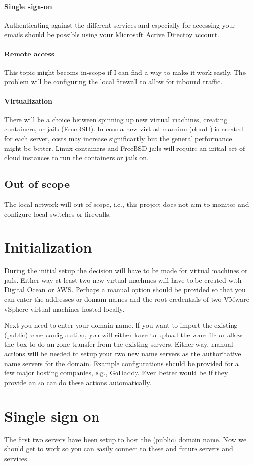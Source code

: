 \documentclass[a4paper,12pt]{scrartcl}
\begin{document}
\paragraph{Single sign-on}
Authenticating against the different services and especially for accessing your emails should be possible using your Microsoft Active Directoy account.

\paragraph{Remote access }
This topic might become in-scope if I can find a way to make it work easily.
The problem will be configuring the local firewall to allow for inbound traffic.

\paragraph{Virtualization}
There will be a choice between spinning up new virtual machines, creating containers, or jails (FreeBSD).
In case a new virtual machine (cloud ) is created for each server, costs may increase significantly but the general performance might be better.
Linux containers and FreeBSD jails will require an initial set of cloud  instances to run the containers or jails on.

\subsection{Out of scope}
The local network will out of scope, i.e., this project does not aim to monitor and configure local switches or firewalls.


\section{Initialization}
\label{sec:initialization}
During the initial setup the decision will have to be made for virtual machines or jails.
Either way at least two new virtual machines will have to be created with Digital Ocean or AWS.
Perhaps a manual option should be provided so that you can enter the  addresses or domain names and the root credentials of two VMware vSphere virtual machines hosted locally.

Next you need to enter your domain name.
If you want to import the existing (public) zone configuration, you will either have to upload the zone file or allow the  box to do an  zone transfer from the existing  servers.
Either way, manual actions will be needed to setup your two new name servers as the authoritative name servers for the domain.
Example configurations should be provided for a few major hosting companies, e.g., GoDaddy.
Even better would be if they provide an  so  can do these actions automatically.


\section{Single sign on}
\label{sec:sso}
The first two servers have been setup to host the (public) domain name.
Now we should get  to work so you can easily connect to these and future servers and services.
\end{document}

